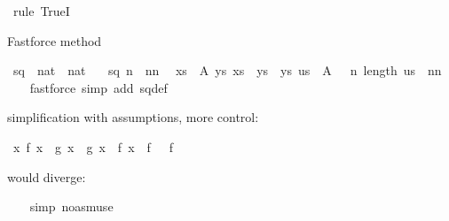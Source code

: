 \begin{isabellebody}
\ {\isacharparenleft}{\kern0pt}rule\ TrueI{\isacharparenright}{\kern0pt}\isanewline
\ \ \isamarkupfalse%
%
\endisatagproof
{\isafoldproof}%
%
\isadelimproof
%
\endisadelimproof
%
\begin{isamarkuptext}%
Fastforce method%
\end{isamarkuptext}\isamarkuptrue%
\isamarkupfalse%
\ sq\ {\isacharcolon}{\kern0pt}{\isacharcolon}{\kern0pt}\ {\isachardoublequoteopen}nat\ {\isasymRightarrow}\ nat{\isachardoublequoteclose}\ \isanewline
\ \ {\isachardoublequoteopen}sq\ n\ {\isacharequal}{\kern0pt}\ n{\isacharasterisk}{\kern0pt}n{\isachardoublequoteclose}\isanewline
\isanewline
{}\isamarkupfalse%
\ {\isachardoublequoteopen}{\isasymlbrakk}\ {\isasymforall}xs\ {\isasymin}\ A{\isachardot}{\kern0pt}\ {\isasymexists}ys{\isachardot}{\kern0pt}\ xs\ {\isacharequal}{\kern0pt}\ ys\ {\isacharat}{\kern0pt}\ ys{\isacharsemicolon}{\kern0pt}\ us\ {\isasymin}\ A\ {\isasymrbrakk}\ {\isasymLongrightarrow}\ {\isasymexists}n{\isachardot}{\kern0pt}\ length\ us\ {\isacharequal}{\kern0pt}\ n{\isacharplus}{\kern0pt}n{\isachardoublequoteclose}\isanewline
%
\isadelimproof
\ \ %
\endisadelimproof
%
\isatagproof
{}\isamarkupfalse%
\ {\isacharparenleft}{\kern0pt}fastforce\ simp\ add{\isacharcolon}{\kern0pt}\ sq{\isacharunderscore}{\kern0pt}def{\isacharparenright}{\kern0pt}%
\endisatagproof
{\isafoldproof}%
%
\isadelimproof
%
\endisadelimproof
%
\begin{isamarkuptext}%
simplification with assumptions, more control:%
\end{isamarkuptext}\isamarkuptrue%
\isamarkupfalse%
\ {\isachardoublequoteopen}{\isasymforall}x{\isachardot}{\kern0pt}\ f\ x\ {\isacharequal}{\kern0pt}\ g\ x\ {\isasymand}\ g\ x\ {\isacharequal}{\kern0pt}\ f\ x\ {\isasymLongrightarrow}\ f\ {\isacharbrackleft}{\kern0pt}{\isacharbrackright}{\kern0pt}\ {\isacharequal}{\kern0pt}\ f\ {\isacharbrackleft}{\kern0pt}{\isacharbrackright}{\kern0pt}\ {\isacharat}{\kern0pt}\ {\isacharbrackleft}{\kern0pt}{\isacharbrackright}{\kern0pt}{\isachardoublequoteclose}%
\begin{isamarkuptext}%
would diverge:%
\end{isamarkuptext}\isamarkuptrue%
%
\isadelimproof
\ \ %
\endisadelimproof
%
\isatagproof
{}\isamarkupfalse%
\ {\isacharparenleft}{\kern0pt}simp\ {\isacharparenleft}{\kern0pt}no{\isacharunderscore}{\kern0pt}asm{\isacharunderscore}{\kern0pt}use{\isacharparenright}{\kern0pt}{\isacharparenright}{\kern0pt}\isanewline

\end{isabellebody}
